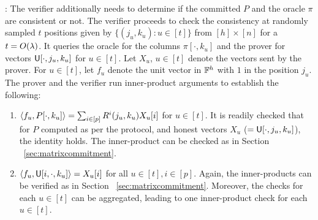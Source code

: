 : The verifier additionally
needs to determine if the committed $P$ and the oracle $\pi$ are consistent or not. The verifier proceeds to check the
consistency at randomly sampled $t$ positions given by $\{(j_u,k_u): u\in [t]\}$ from
$[h]\times [n]$ for a $t=O(\lambda)$. It queries the oracle for the columns $\pi[\cdot,k_u]$ and the prover for vectors $\mathsf{U}[\cdot,j_u,k_u]$ for
$u\in [t]$. Let $X_u$, $u\in [t]$ denote the vectors sent by the prover. For $u\in [t]$, let $f_u$ denote the unit vector in $\mathbb{F}^h$ with $1$ in the position
$j_u$. The prover and the verifier run inner-product arguments to establish the following:
\begin{enumerate}[{\rm 1.}]
\item $\langle f_u,P[\cdot,k_u]\rangle=\sum_{i\in [p]}R^i(j_u,k_u)X_u[i]$ for $u\in
[t]$. It is readily checked that for $P$ computed as per the protocol, 
and honest vectors $X_u$ ($=\mathsf{U}[\cdot , j_u,k_u]$), the identity holds. The inner-product
can be checked as in Section ~\ref{sec:matrixcommitment}.

\item $\langle f_u,\mathsf{U}[i,\cdot,k_u]\rangle=X_u[i]$ for all $u\in [t],i\in
[p]$. %
Again, 
the inner-products can be verified as in Section ~\ref{sec:matrixcommitment}.
Moreover, the checks for each
$u\in [t]$ can be aggregated, leading to one inner-product check for each $u\in
[t]$.
\end{enumerate}


